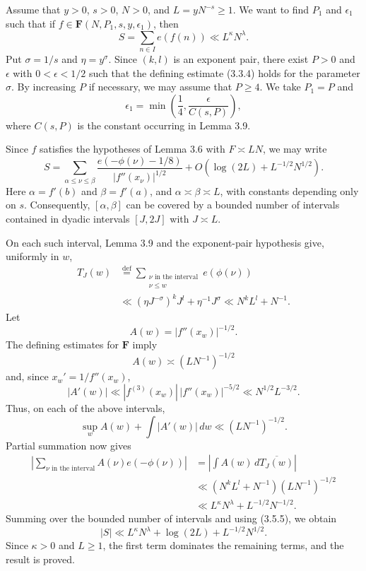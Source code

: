 \documentclass[10pt]{article}
\newcommand{\Fclass}{\mathbf{F}}
\newcommand{\defeq}{\mathrel{\stackrel{\mathrm{def}}{=}}}
\begin{document}
Assume that $y>0$, $s>0$, $N>0$, and $L=yN^{-s}\geq1$. We want to find
$P_1$ and $\epsilon_1$ such that if
$f\in\Fclass(N,P_1,s,y,\epsilon_1)$, then
\[
 S=\sum_{n\in I}e(f(n))\ll L^\kappa N^\lambda.
\]
Put $\sigma=1/s$ and $\eta=y^\sigma$. Since $(k,l)$ is an exponent pair,
there exist $P>0$ and $\epsilon$ with $0<\epsilon<1/2$ such that the defining
estimate (3.3.4) holds for the parameter $\sigma$. By increasing $P$ if
necessary, we may assume that $P\geq4$. We take $P_1=P$ and
\[
 \epsilon_1=\min\left(\frac14,\frac{\epsilon}{C(s,P)}\right),
\]
where $C(s,P)$ is the constant occurring in Lemma 3.9.

Since $f$ satisfies the hypotheses of Lemma 3.6 with $F\asymp LN$, we may
write
\begin{equation*}
 S=\sum_{\alpha\leq\nu\leq\beta}
 \frac{e(-\phi(\nu)-1/8)}{|f''(x_\nu)|^{1/2}}
 +O\left(\log(2L)+L^{-1/2}N^{1/2}\right). \tag{3.5.5}
\end{equation*}
Here $\alpha=f'(b)$ and $\beta=f'(a)$, and
$\alpha\asymp\beta\asymp L$, with constants depending only on $s$.
Consequently, $[\alpha,\beta]$ can be covered by a bounded number of intervals
contained in dyadic intervals $[J,2J]$ with $J\asymp L$.

On each such interval, Lemma 3.9 and the exponent-pair hypothesis give,
uniformly in $w$,
\[
\begin{aligned}
 T_J(w)
 &\defeq\sum_{\substack{\nu\text{ in the interval}\\\nu\leq w}}
 e(\phi(\nu)) \\
 &\ll(\eta J^{-\sigma})^kJ^l+\eta^{-1}J^\sigma
 \ll N^kL^l+N^{-1}.
\end{aligned}
\]
Let
\[
 A(w)=|f''(x_w)|^{-1/2}.
\]
The defining estimates for $\Fclass$ imply
\[
 A(w)\asymp(LN^{-1})^{-1/2}
\]
and, since $x_w'=1/f''(x_w)$,
\[
 |A'(w)|\ll |f^{(3)}(x_w)|\,|f''(x_w)|^{-5/2}
 \ll N^{1/2}L^{-3/2}.
\]
Thus, on each of the above intervals,
\[
 \sup_w A(w)+\int|A'(w)|\,dw\ll(LN^{-1})^{-1/2}.
\]
Partial summation now gives
\[
\begin{aligned}
 \left|\sum_{\nu\text{ in the interval}}
 A(\nu)e(-\phi(\nu))\right|
 &=\left|\int A(w)\,d\overline{T_J(w)}\right| \\
 &\ll(N^kL^l+N^{-1})(LN^{-1})^{-1/2} \\
 &\ll L^\kappa N^\lambda+L^{-1/2}N^{-1/2}.
\end{aligned}
\]
Summing over the bounded number of intervals and using (3.5.5), we obtain
\[
 |S|\ll L^\kappa N^\lambda
       +\log(2L)+L^{-1/2}N^{1/2}.
\]
Since $\kappa>0$ and $L\geq1$, the first term dominates the remaining terms,
and the result is proved.
\end{document}
